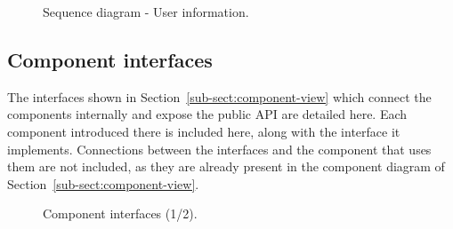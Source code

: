 \begin{figure}[H]
    \centering
    \caption{\label{fig:sequence-user-information}Sequence diagram - User information.}
\end{figure}

\subsection{Component interfaces}
The interfaces shown in Section~\ref{sub-sect:component-view}  which connect the components internally and expose the public API are detailed here. Each component introduced there is included here, along with the interface it implements. Connections between the interfaces and the component that uses them are not included, as they are already present in the component diagram of Section~\ref{sub-sect:component-view}.

\begin{figure}[H]
    \centering
    \caption{\label{fig:interfaces-1}Component interfaces (1/2).}
\end{figure}


